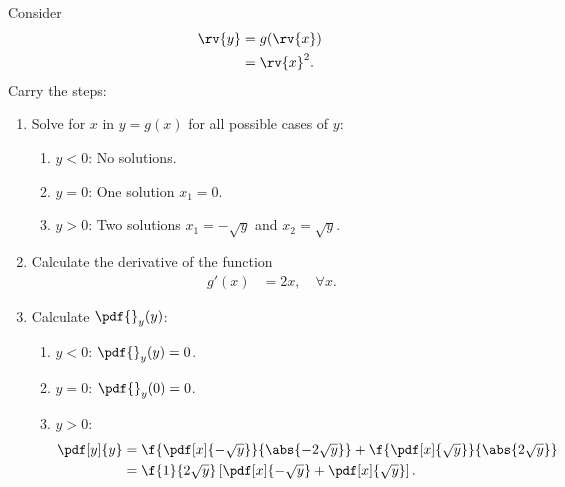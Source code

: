 \begin{example}
    Consider 
    \begin{align}
        \rv{y} 
        &= g(\rv{x})\\
        &= \rv{x}^{2}.
    \end{align}
    Carry the steps:
    \begin{enumerate}
        \item Solve for $x$ in $y=g(x)$ for all possible cases of $y$:
        \begin{enumerate}
            \item $y<0$: No solutions.
            \item $y=0$: One solution $x_{1}=0$.
            \item $y>0$: Two solutions $x_{1}=-\sqrt{y}$ and $x_{2}=\sqrt{y}$.
        \end{enumerate}
        \item Calculate the derivative of the function
        \begin{align}
            g'(x) &= 2x, \quad \forall x.
        \end{align}
        \item Calculate $\pdf{}_{y}(y)$:
        \begin{enumerate}
            \item $y<0$: $\pdf{}_{y}(y) = 0$.
            \item $y=0$: $\pdf{}_{y}(0)=0$.            
            \item $y>0$: 
            \begin{align}
                \pdf[y]{y} &= \f{\pdf[x]{-\sqrt{y}}}{\abs{-2\sqrt{y}}} + \f{\pdf[x]{\sqrt{y}}}{\abs{2\sqrt{y}}}\\
                &= \f{1}{2\sqrt{y}}\left[ \pdf[x]{-\sqrt{y}} + \pdf[x]{\sqrt{y}} \right].
            \end{align}
        \end{enumerate}
    \end{enumerate}
    \triqed
\end{example}


